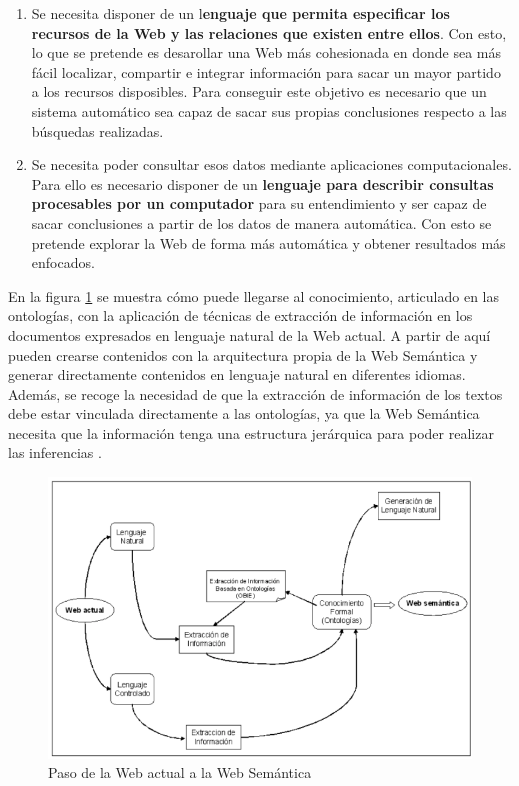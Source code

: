 \begin{enumerate}
	\item Se necesita disponer de un l\textbf{enguaje que permita especificar los recursos de la Web y las relaciones que existen entre ellos}. Con esto, lo que se pretende es desarollar una Web más cohesionada en donde sea más fácil localizar, compartir e integrar información para sacar un mayor partido a los recursos disposibles. Para conseguir este objetivo es necesario que un sistema automático sea capaz de sacar sus propias conclusiones respecto a las búsquedas realizadas.
	
	\item Se necesita poder consultar esos datos mediante aplicaciones computacionales. Para ello es necesario disponer de un \textbf{lenguaje para describir consultas procesables por un computador} para su entendimiento y ser capaz de sacar conclusiones a partir de los datos de manera automática. Con esto se pretende explorar la Web de forma más automática y obtener resultados más enfocados.
\end{enumerate}

En la figura \ref{fig:pasowa-ws} se muestra cómo puede llegarse al conocimiento, articulado en las ontologías, con la aplicación de técnicas de extracción de información en los documentos expresados en lenguaje natural de la Web actual. A partir de aquí pueden crearse contenidos con la arquitectura propia de la Web Semántica y generar directamente contenidos en lenguaje natural en diferentes idiomas. Además, se recoge la necesidad de que la extracción de información de los textos debe estar vinculada directamente a las ontologías, ya que la Web Semántica necesita que la información tenga una estructura jerárquica para poder realizar las inferencias \cite{researchgate}.

\begin{figure}[H]
	\centering
	\includegraphics[width=0.89\linewidth]{imagenes/capitulo3/pasoWA-WS}
	\caption{Paso de la Web actual a la Web Semántica \cite{researchgate}}
	\label{fig:pasowa-ws}
\end{figure}

